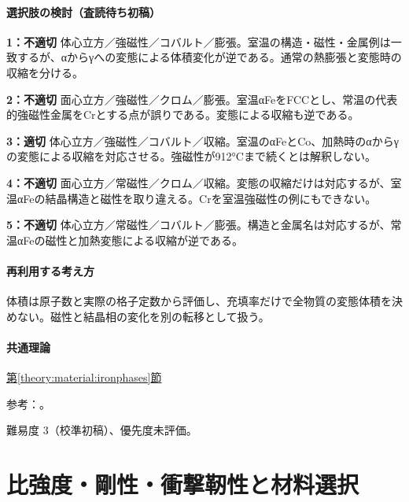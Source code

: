 \paragraph{選択肢の検討（査読待ち初稿）}\mbox{}\par

\noindent\textbf{1：不適切} 体心立方／強磁性／コバルト／膨張。室温の構造・磁性・金属例は一致するが、αからγへの変態による体積変化が逆である。通常の熱膨張と変態時の収縮を分ける。\par

\noindent\textbf{2：不適切} 面心立方／強磁性／クロム／膨張。室温αFeをFCCとし、常温の代表的強磁性金属をCrとする点が誤りである。変態による収縮も逆である。\par

\noindent\textbf{3：適切} 体心立方／強磁性／コバルト／収縮。室温のαFeとCo、加熱時のαからγの変態による収縮を対応させる。強磁性が912°Cまで続くとは解釈しない。\par

\noindent\textbf{4：不適切} 面心立方／常磁性／クロム／収縮。変態の収縮だけは対応するが、室温αFeの結晶構造と磁性を取り違える。Crを室温強磁性の例にもできない。\par

\noindent\textbf{5：不適切} 体心立方／常磁性／コバルト／膨張。構造と金属名は対応するが、常温αFeの磁性と加熱変態による収縮が逆である。\par

\paragraph{再利用する考え方} 体積は原子数と実際の格子定数から評価し、充填率だけで全物質の変態体積を決めない。磁性と結晶相の変化を別の転移として扱う。

\paragraph{共通理論} \hyperref[theory:material:ironphases]{第\ref*{theory:material:ironphases}節}

\par 参考：\cite{princeton_iron,iron_transform2023,openstax_magnetism,iron_curie1954}。

\par 難易度 3（校準初稿）、優先度未評価。

\section{比強度・剛性・衝撃靭性と材料選択}

